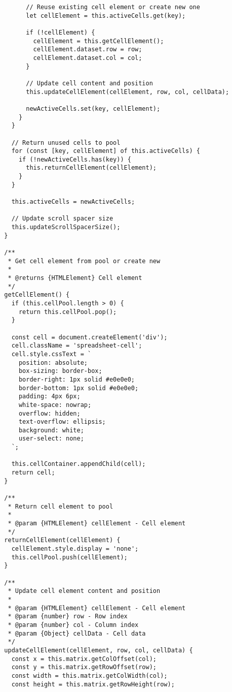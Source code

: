 \documentclass[11pt]{article}
\begin{document}
\begin{verbatim}
        // Reuse existing cell element or create new one
        let cellElement = this.activeCells.get(key);
        
        if (!cellElement) {
          cellElement = this.getCellElement();
          cellElement.dataset.row = row;
          cellElement.dataset.col = col;
        }
        
        // Update cell content and position
        this.updateCellElement(cellElement, row, col, cellData);
        
        newActiveCells.set(key, cellElement);
      }
    }
    
    // Return unused cells to pool
    for (const [key, cellElement] of this.activeCells) {
      if (!newActiveCells.has(key)) {
        this.returnCellElement(cellElement);
      }
    }
    
    this.activeCells = newActiveCells;
    
    // Update scroll spacer size
    this.updateScrollSpacerSize();
  }
  
  /**
   * Get cell element from pool or create new
   * 
   * @returns {HTMLElement} Cell element
   */
  getCellElement() {
    if (this.cellPool.length > 0) {
      return this.cellPool.pop();
    }
    
    const cell = document.createElement('div');
    cell.className = 'spreadsheet-cell';
    cell.style.cssText = `
      position: absolute;
      box-sizing: border-box;
      border-right: 1px solid #e0e0e0;
      border-bottom: 1px solid #e0e0e0;
      padding: 4px 6px;
      white-space: nowrap;
      overflow: hidden;
      text-overflow: ellipsis;
      background: white;
      user-select: none;
    `;
    
    this.cellContainer.appendChild(cell);
    return cell;
  }
  
  /**
   * Return cell element to pool
   * 
   * @param {HTMLElement} cellElement - Cell element
   */
  returnCellElement(cellElement) {
    cellElement.style.display = 'none';
    this.cellPool.push(cellElement);
  }
  
  /**
   * Update cell element content and position
   * 
   * @param {HTMLElement} cellElement - Cell element
   * @param {number} row - Row index
   * @param {number} col - Column index
   * @param {Object} cellData - Cell data
   */
  updateCellElement(cellElement, row, col, cellData) {
    const x = this.matrix.getColOffset(col);
    const y = this.matrix.getRowOffset(row);
    const width = this.matrix.getColWidth(col);
    const height = this.matrix.getRowHeight(row);
    

\end{verbatim}
\end{document}
